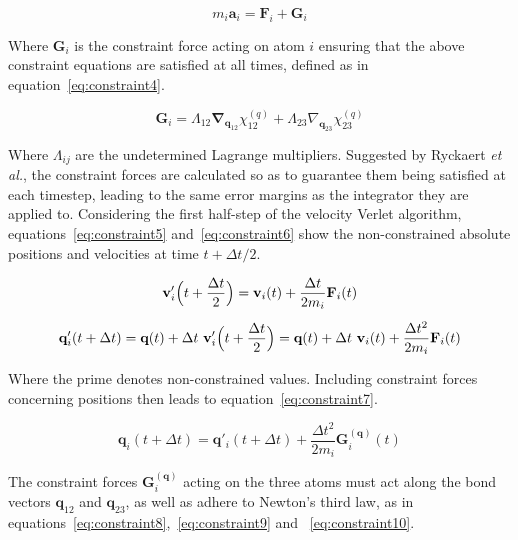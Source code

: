 \documentclass[11pt]{article}
\begin{document}
\begin{equation}
  m_i\mathbf{a}_i = \textbf{F}_i + \mathbf{G}_i
  \label{eq:constraint3}
\end{equation}

\bigskip

\noindent Where $\mathbf{G}_i$ is the constraint force acting on atom $i$ ensuring that the above constraint equations are satisfied at all times, defined as in equation~\ref{eq:constraint4}.

\begin{equation}
  \mathbf{G}_i = \Lambda_{12} \mathbf{\nabla}_{\mathbf{q}_{12}}\chi^{(q)}_{12} + \Lambda_{23} \nabla_{\mathbf{q}_{23}}\chi^{(q)}_{23}
  \label{eq:constraint4}
\end{equation}

\bigskip

\noindent Where $\Lambda_{ij}$ are the undetermined Lagrange multipliers. Suggested by Ryckaert \textit{et al.}, the constraint forces are calculated so as to guarantee them being satisfied at each timestep, leading to the same error margins as the integrator they are applied to. Considering the first half-step of the velocity Verlet algorithm, equations~\ref{eq:constraint5} and~\ref{eq:constraint6} show the non-constrained absolute positions and velocities at time $t + \Delta t/2$.


\begin{gather}
  \textbf{v}'_i\Bigl(t + \frac{\Delta t}{2}\Bigr) =\textbf{v}_i(t) + \frac{\Delta t}{2m_i}\textbf{F}_i(t)
  \label{eq:constraint5}\\[5pt]
  \textbf{q}'_i(t + \Delta t) = \textbf{q}(t) + \Delta t\ \textbf{v}'_i\Bigl(t + \frac{\Delta t}{2}\Bigr) = \textbf{q}(t) + \Delta t \ \textbf{v}_i(t) + \frac{\Delta t^2}{2m_i}\textbf{F}_i(t)
  \label{eq:constraint6}
\end{gather}

\bigskip

\noindent Where the prime denotes non-constrained values. Including constraint forces concerning positions then leads to equation~\ref{eq:constraint7}.

\begin{equation}
  \mathbf{q}_i(t + \Delta t) = \mathbf{q}'_i(t + \Delta t) + \frac{\Delta t^2}{2m_i} \textbf{G}_i^{\mathbf{(q)}}(t)
  \label{eq:constraint7}
\end{equation}

\bigskip

\noindent The constraint forces $\textbf{G}_i^{\mathbf{(q)}}$ acting on the three atoms must act along the bond vectors $\textbf{q}_{12}$ and $\textbf{q}_{23}$, as well as adhere to Newton's third law, as in equations~\ref{eq:constraint8},~\ref{eq:constraint9} and ~\ref{eq:constraint10}.
\end{document}
